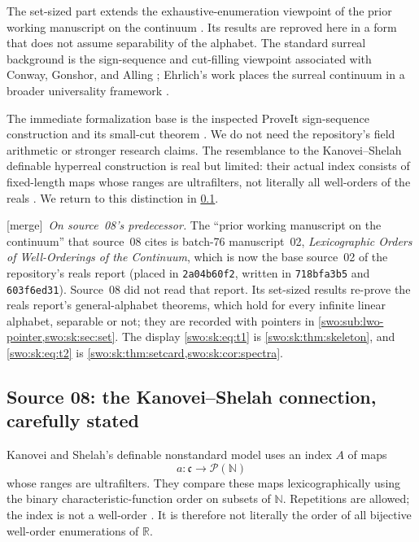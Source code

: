 \documentclass[11pt]{article}
\theoremstyle{definition}
\theoremstyle{remark}
\newcommand{\code}[1]{\texttt{\small #1}}
\newcommand{\merge}{\textsf{[merge]}}
\begin{document}
The set-sized part extends the exhaustive-enumeration viewpoint of the
prior working manuscript on the continuum \cite{Batch76Source02}. Its results are
reproved here in a form that does not assume separability of the
alphabet. The standard surreal background is the sign-sequence and
cut-filling viewpoint associated with Conway, Gonshor, and Alling
\cite{Conway,Gonshor,Alling}; Ehrlich's work places the surreal continuum
in a broader universality framework \cite{Ehrlich2012}.

The immediate formalization base is the inspected ProveIt sign-sequence
construction and its small-cut theorem \cite{ProveItSigns,ProveItCutFill}. We do not
need the repository's field arithmetic or stronger research claims.
The resemblance to the Kanovei--Shelah definable hyperreal construction
is real but limited: their actual index consists of fixed-length maps
whose ranges are ultrafilters, not literally all well-orders of the
reals \cite{KanoveiShelah}. We return to this distinction in \cref{swo:sk:sec:KS}.


\merge\ \emph{On source~08's predecessor.} The ``prior working manuscript on
the continuum'' that source~08 cites \cite{Batch76Source02} is batch-76
manuscript~02, \emph{Lexicographic Orders of Well-Orderings of the Continuum},
which is now the base source~02 of the repository's reals report (placed in
\code{2a04b60f2}, written in \code{718bfa3b5} and \code{603f6ed31}). Source~08
did not read that report. Its set-sized results re-prove the reals report's
general-alphabet theorems, which hold for every infinite linear alphabet,
separable or not; they are recorded with pointers in
\cref{swo:sub:lwo-pointer,swo:sk:sec:set}. The display \eqref{swo:sk:eq:t1}
is \cref{swo:sk:thm:skeleton}, and \eqref{swo:sk:eq:t2} is
\cref{swo:sk:thm:setcard,swo:sk:cor:spectra}.

\subsection{Source 08: the Kanovei--Shelah connection, carefully stated}\label{swo:sk:sec:KS}

Kanovei and Shelah's definable nonstandard model uses an index $A$ of
maps
\[
                 a:\mathfrak c\longrightarrow\mathcal P(\mathbb N)
\]
whose ranges are ultrafilters. They compare these maps lexicographically
using the binary characteristic-function order on subsets of
$\mathbb N$. Repetitions are allowed; the index is not a well-order
\cite{KanoveiShelah}. It is therefore not literally the order of all bijective
well-order enumerations of $\mathbb R$.
\end{document}
